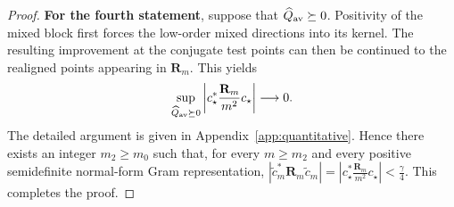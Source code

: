 \begin{proof}
\noindent
\textbf{For the fourth statement}, suppose that
$\widehat Q_{\rm av}\succeq0$.  Positivity of the mixed block first
forces the low-order mixed directions into its kernel.  The resulting
improvement at the conjugate test points can then be continued to the
realigned points appearing in $\mathbf R_m$.  This yields
\[
 \sup_{\widehat Q_{\rm av}\succeq0}
 \left|
 c_\star^*\frac{\mathbf R_m}{m^2}c_\star
 \right|
 \longrightarrow0.
\]
The detailed argument is given in Appendix~\ref{app:quantitative}.
Hence there exists an integer $m_2\ge m_0$ such that, for every
$m\ge m_2$ and every positive semidefinite normal-form Gram
representation,
$
 \left|
 \widetilde c_m^*\mathbf R_m\widetilde c_m
 \right|
 =
 \left|
 c_\star^*\frac{\mathbf R_m}{m^2}c_\star
 \right|
 <\frac{\gamma}{4}.
$
This completes the proof.
\end{proof}



